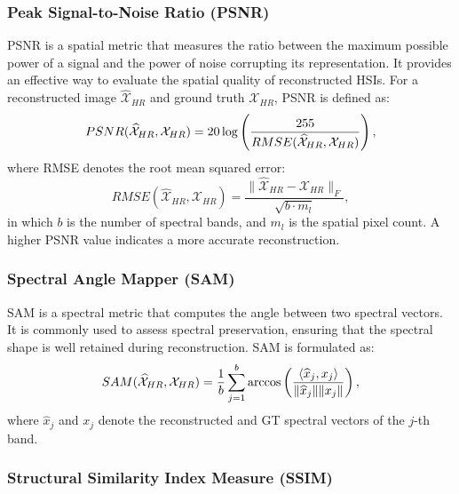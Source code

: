 \subsubsection*{Peak Signal-to-Noise Ratio (PSNR)}

PSNR is a spatial metric that measures the ratio between the maximum possible power of a signal and the power of noise corrupting its representation. 
It provides an effective way to evaluate the spatial quality of reconstructed HSIs. 
For a reconstructed image $\widehat{\mathcal{X}}_{HR}$ and ground truth $\mathcal{X}_{HR}$, PSNR is defined as:
\begin{equation}
    PSNR(\widehat{\mathcal{X}}_{HR}, \mathcal{X}_{HR}) 
    = 20 \log \left( \frac{255}{RMSE(\widehat{\mathcal{X}}_{HR}, \mathcal{X}_{HR})} \right), \notag
\end{equation}
where RMSE denotes the root mean squared error:
\begin{equation}
    \label{eq:rmse}
    RMSE(\widehat{\mathcal{X}}_{HR}, \mathcal{X}_{HR}) 
    = \frac{ \lVert \widehat{\mathcal{X}}_{HR} - \mathcal{X}_{HR} \rVert_F }
           {\sqrt{b \cdot m_l}},
\end{equation}
in which $b$ is the number of spectral bands, and $m_l$ is the spatial pixel count. 
A higher PSNR value indicates a more accurate reconstruction.

\subsubsection*{Spectral Angle Mapper (SAM)}

SAM is a spectral metric that computes the angle between two spectral vectors. 
It is commonly used to assess spectral preservation, ensuring that the spectral 
shape is well retained during reconstruction. SAM is formulated as:
\begin{equation}
    SAM(\widehat{\mathcal{X}}_{HR}, \mathcal{X}_{HR})
    = \frac{1}{b} \sum_{j=1}^{b}
    \arccos \left(
    \frac{ \langle \widehat{x}_{j}, x_{j} \rangle }
         { \lVert \widehat{x}_{j} \rVert \lVert x_{j} \rVert }
    \right), \notag
\end{equation}
where $\widehat{x}_{j}$ and $x_{j}$ denote the reconstructed and GT spectral vectors of the $j$-th band.


\subsubsection*{Structural Similarity Index Measure (SSIM)}

